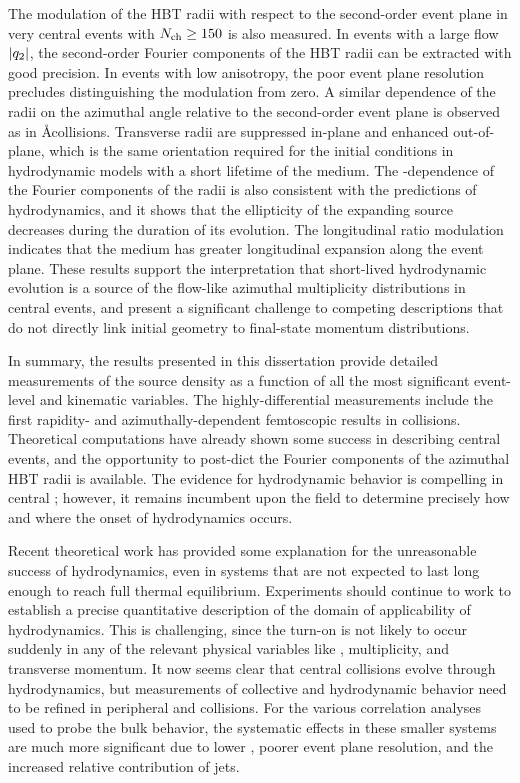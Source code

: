 The modulation of the HBT radii with respect to the second-order event plane in very central \pPb events with $\mbox{$N_{\mathrm{ch}}$} \geq 150$ is also measured.
In events with a large flow $|q_{2}|$, the second-order Fourier components of the HBT radii can be extracted with good precision.
In events with low anisotropy, the poor event plane resolution precludes distinguishing the modulation from zero.
A similar dependence of the radii on the azimuthal angle relative to the second-order event plane is observed as in \AA collisions.
Transverse radii are suppressed in-plane and enhanced out-of-plane, which is the same orientation required for the initial conditions in hydrodynamic models with a short lifetime of the medium.
The \kt-dependence of the Fourier components of the radii is also consistent with the predictions of hydrodynamics, and it shows that the ellipticity of the expanding source decreases during the duration of its evolution.
The longitudinal ratio \Rlong modulation indicates that the medium has greater longitudinal expansion along the event plane.
These results support the interpretation that short-lived hydrodynamic evolution is a source of the flow-like azimuthal multiplicity distributions in central \pPb events, and present a significant challenge to competing descriptions that do not directly link initial geometry to final-state momentum distributions.

In summary, the results presented in this dissertation provide detailed measurements of the \pPb source density as a function of all the most significant event-level and kinematic variables.
The highly-differential measurements include the first rapidity- and azimuthally-dependent femtoscopic results in \pA collisions.
Theoretical computations have already shown some success in describing central \pPb events, and the opportunity to post-dict the Fourier components of the azimuthal HBT radii is available.
The evidence for hydrodynamic behavior is compelling in central \pPb; however, it remains incumbent upon the field to determine precisely how and where the onset of hydrodynamics occurs.


Recent theoretical work has provided some explanation for the unreasonable success of hydrodynamics, even in systems that are not expected to last long enough to reach full thermal equilibrium.
Experiments should continue to work to establish a precise quantitative description of the domain of applicability of hydrodynamics.
This is challenging, since the turn-on is not likely to occur suddenly in any of the relevant physical variables like \Npart, multiplicity, and transverse momentum.
It now seems clear that central \pPb collisions evolve through hydrodynamics, but measurements of collective and hydrodynamic behavior need to be refined in peripheral \pPb and \pp collisions.
For the various correlation analyses used to probe the bulk behavior, the systematic effects in these smaller systems are much more significant due to lower \Nch, poorer event plane resolution, and the increased relative contribution of jets.


